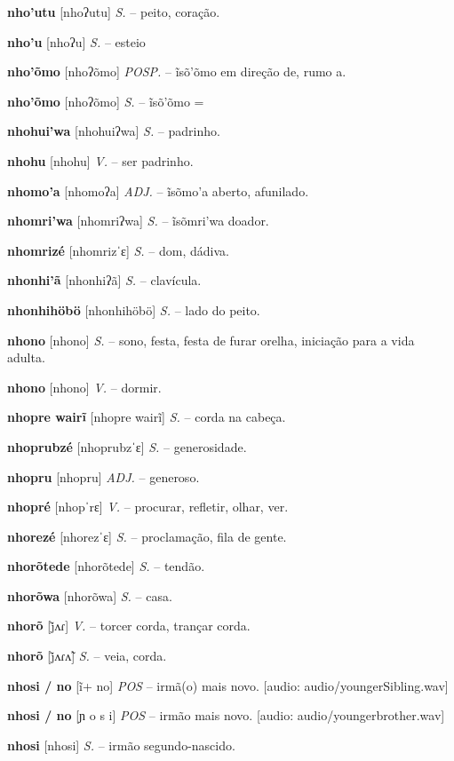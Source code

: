 \textbf{nho'utu} [nhoʔutu] \textit{S.} -- peito, coração.

\textbf{nho'u} [nhoʔu] \textit{S.} -- esteio

\textbf{nho'õmo} [nhoʔõmo] \textit{POSP.} -- ĩsõ'õmo em direção de, rumo a.

\textbf{nho'õmo} [nhoʔõmo] \textit{S.} -- ĩsõ'õmo =

\textbf{nhohui'wa} [nhohuiʔwa] \textit{S.} -- padrinho.

\textbf{nhohu} [nhohu] \textit{V.} -- ser padrinho.

\textbf{nhomo'a} [nhomoʔa] \textit{ADJ.} -- ĩsõmo'a aberto, afunilado.

\textbf{nhomri'wa} [nhomriʔwa] \textit{S.} -- ĩsõmri'wa doador.

\textbf{nhomrizé} [nhomrizˈɛ] \textit{S.} -- dom, dádiva.

\textbf{nhonhi'ã} [nhonhiʔã] \textit{S.} -- clavícula.

\textbf{nhonhihöbö} [nhonhihöbö] \textit{S.} -- lado do peito.

\textbf{nhono} [nhono] \textit{S.} -- sono, festa, festa de furar orelha, iniciação para a vida adulta.

\textbf{nhono} [nhono] \textit{V.} -- dormir.

\textbf{nhopre wairĩ} [nhopre wairĩ] \textit{S.} -- corda na cabeça.

\textbf{nhoprubzé} [nhoprubzˈɛ] \textit{S.} -- generosidade.

\textbf{nhopru} [nhopru] \textit{ADJ.} -- generoso.

\textbf{nhopré} [nhopˈrɛ] \textit{V.} -- procurar, refletir, olhar, ver.

\textbf{nhorezé} [nhorezˈɛ] \textit{S.} -- proclamação, fila de gente.

\textbf{nhorõtede} [nhorõtede] \textit{S.} -- tendão.

\textbf{nhorõwa} [nhorõwa] \textit{S.} -- casa.

\textbf{nhorõ} [j̃ʌɾ] \textit{V.} -- torcer corda, trançar corda.

\textbf{nhorõ} [j̃ʌɾʌ̃] \textit{S.} -- veia, corda.

\textbf{nhosi / no} [ĩ+ no] \textit{POS} -- irmã(o) mais novo. [audio: audio/youngerSibling.wav]{\faHeadphones}

\textbf{nhosi / no} [ɲ o s i] \textit{POS} -- irmão mais novo. [audio: audio/youngerbrother.wav]{\faHeadphones}

\textbf{nhosi} [nhosi] \textit{S.} -- irmão segundo-nascido.

